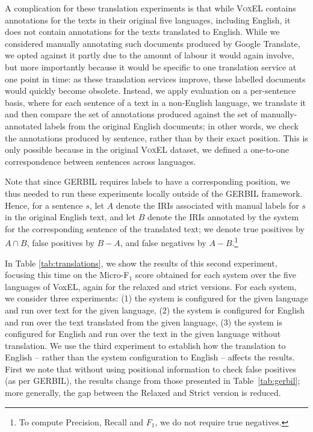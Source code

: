 \documentclass{llncs}
\begin{document}
A complication for these translation experiments is that while \textsc{VoxEL} contains annotations for the texts in their original five languages, including English, it does not contain annotations for the texts translated to English. While we considered manually annotating such documents produced by Google Translate, we opted against it partly due to the amount of labour it would again involve, but more importantly because it would be specific to one translation service at one point in time: as these translation services improve, these labelled documents would quickly become obsolete. Instead, we apply evaluation on a per-sentence basis, where for each sentence of a text in a non-English language, we translate it and then compare the set of annotations produced against the set of manually-annotated labels from the original English documents; in other words, we check the annotations produced by sentence, rather than by their exact position. This is only possible because in the original \textsc{VoxEL} dataset, we defined a one-to-one correspondence between sentences across languages. 

Note that since GERBIL requires labels to have a corresponding position, we thus needed to run these experiments locally outside of the GERBIL framework. Hence, for a sentence $s$, let $A$ denote the IRIs associated with manual labels for $s$ in the original English text, and let $B$ denote the IRIs annotated by the system for the corresponding sentence of the translated text; we denote true positives by $A \cap B$, false positives by $B - A$, and false negatives by $A - B$.\footnote{To compute Precision, Recall and $F_1$, we do not require true negatives.}

\newcommand{\blank}{\underline{\hspace{0.5em}}}

In Table \ref{tab:translations}, we show the results of this second experiment, focusing this time on the Micro-F$_1$ score obtained for each system over the five languages of VoxEL, again for the relaxed and strict versions. For each system, we consider three experiments: (1) the system is configured for the given language and run over text for the given language, (2) the system is configured for English and run over the text translated from the given language, (3) the system is configured for English and run over the text in the given language without translation. We use the third experiment to establish how the translation to English -- rather than the system configuration to English -- affects the results. First we note that without using positional information to check false positives (as per GERBIL), the results change from those presented in Table~\ref{tab:gerbil}; more generally, the gap between the Relaxed and Strict version is reduced. 
\end{document}
